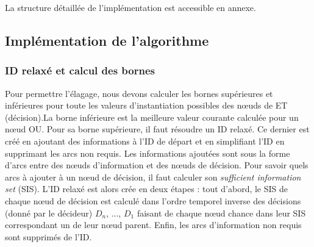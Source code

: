 \documentclass[12pt]{article}
\begin{document}
La structure détaillée de l'implémentation est accessible en annexe.

\subsection{Implémentation de l'algorithme}

\subsubsection{ID relaxé et calcul des bornes}
Pour permettre l'élagage, nous devons calculer les bornes supérieures et inférieures pour toute les valeurs d'instantiation possibles des nœuds de ET (décision).La borne inférieure est la meilleure valeur courante calculée pour un nœud OU.
Pour sa borne supérieure, il faut résoudre un ID relaxé. 
Ce dernier est créé en ajoutant des informations à l'ID de départ et en simplifiant l'ID en supprimant les arcs non requis. 
\bigbreak
Les informations ajoutées sont sous la forme d'arcs entre des nœuds d'information et des nœuds de décision. Pour savoir quels arcs à ajouter à un nœud de décision, il faut calculer son \textit{sufficient information set} (SIS).
\bigbreak
L'ID relaxé est alors crée en deux étapes :
tout d'abord, le SIS de chaque nœud de décision est calculé dans l'ordre temporel inverse des décisions (donné par le décideur) $D_n$, ..., $D_1$ faisant de chaque nœud chance dans leur SIS correspondant un de leur nœud parent.
Enfin, les arcs d'information non requis sont supprimés de l'ID.
\end{document}
